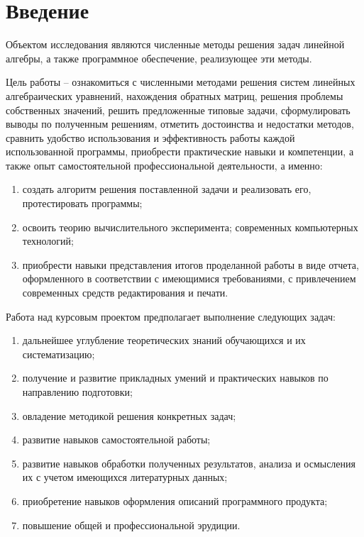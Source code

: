\section{Введение}
Объектом исследования являются численные методы решения задач 
линейной алгебры, а также программное обеспечение, реализующее эти 
методы.

Цель работы – ознакомиться с численными методами решения систем 
линейных алгебраических уравнений, нахождения обратных матриц, 
решения проблемы собственных значений, решить предложенные типовые 
задачи, сформулировать выводы по полученным решениям, отметить 
достоинства и недостатки методов, сравнить удобство использования и 
эффективность работы каждой использованной программы, приобрести 
практические навыки и компетенции, а также опыт самостоятельной 
профессиональной деятельности, а именно:

\begin{enumerate}
  \item создать алгоритм решения поставленной задачи и реализовать его, 
  протестировать программы;
  \item освоить теорию вычислительного эксперимента; современных 
  компьютерных технологий; 
  \item приобрести навыки представления итогов проделанной работы в виде 
  отчета, оформленного в соответствии с имеющимися требованиями, с 
  привлечением современных средств редактирования и печати.
\end{enumerate}

  Работа над курсовым проектом предполагает выполнение следующих 
задач:

\begin {enumerate}
  \item дальнейшее углубление теоретических знаний обучающихся и их 
  систематизацию;
  \item получение и развитие прикладных умений и практических навыков по 
  направлению подготовки;
  \item овладение методикой решения конкретных задач;
  \item развитие навыков самостоятельной работы;
  \item развитие навыков обработки полученных результатов, анализа и 
  осмысления их с учетом имеющихся литературных данных;
  \item приобретение навыков оформления описаний программного продукта;
  \item повышение общей и профессиональной эрудиции.
\end {enumerate}
